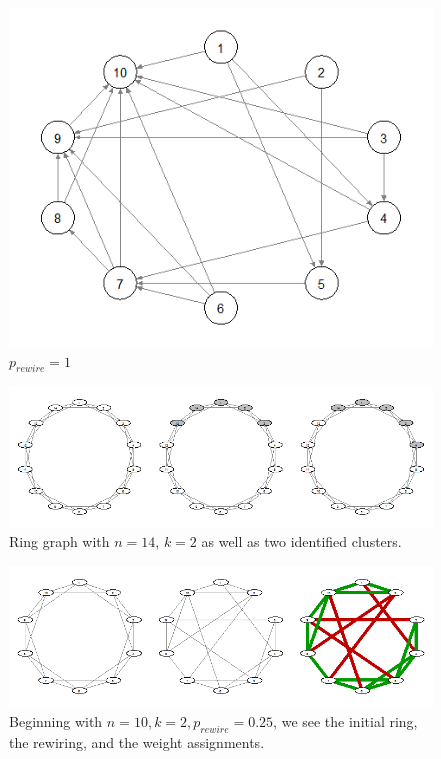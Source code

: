 \documentclass{article}
\begin{document}
\begin{figure}
\centering
\includegraphics[width=1\textwidth]{p100.png}
\caption{\label{fig:p100}$p_{rewire}=1$}
\end{figure}

\begin{figure}
\centering
\includegraphics[width=1\textwidth]{p0n14c.png}
\caption{\label{fig:p0n14c}Ring graph with $n = 14$, $k = 2$ as well as two identified clusters.}
\end{figure}

\begin{figure}
\centering
\includegraphics[width=1\textwidth]{wt_gen_steps.png}
\caption{\label{fig:wt_gen_steps}Beginning with $n=10, k=2, p_{rewire}=0.25$, we see the initial ring, the rewiring, and the weight assignments.}
\end{figure}
\end{document}
